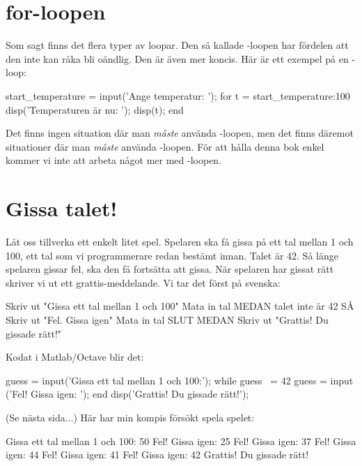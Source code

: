 \section{for-loopen}
Som sagt finns det flera typer av loopar. Den så kallade -loopen har fördelen att den inte kan råka bli oändlig. Den är även mer koncis. Här är ett exempel på en -loop:
\vspace{10pt}
\begin{matlab}
start_temperature = input('Ange temperatur: ');
for t = start_temperature:100
	disp('Temperaturen är nu: ');
	disp(t);
end
\end{matlab}

Det finns ingen situation där man \emph{måste} använda -loopen, men det finns däremot situationer där man \emph{måste} använda -loopen. För att hålla denna bok enkel kommer vi inte att arbeta något mer med -loopen.

\section{Gissa talet!}\label{subsec:gissa_talet1}
Låt oss tillverka ett enkelt litet spel. Spelaren ska få gissa på ett tal mellan 1 och 100, ett tal som vi programmerare redan bestämt innan. Talet är 42. Så länge spelaren gissar fel, ska den få fortsätta att gissa. När spelaren har gissat rätt skriver vi ut ett grattis-meddelande. Vi tar det först på svenska:

\begin{pseudo}
Skriv ut "Gissa ett tal mellan 1 och 100"
Mata in tal
MEDAN talet inte är 42 SÅ
   Skriv ut "Fel. Gissa igen"
   Mata in tal
SLUT MEDAN
Skriv ut "Grattis! Du gissade rätt!"
\end{pseudo}

Kodat i Matlab/Octave blir det:

\begin{matlab}[caption={Gissa talet},label={}]
guess = input('Gissa ett tal mellan 1 och 100:');
while guess ~= 42
    guess = input ('Fel! Gissa igen: ');
end
disp('Grattis! Du gissade rätt!');
\end{matlab}

(Se nästa sida...)
\newpage
Här har min kompis försökt spela spelet:

\vspace{10pt}
\begin{matlab}
Gissa ett tal mellan 1 och 100: 50
Fel! Gissa igen: 25
Fel! Gissa igen: 37
Fel! Gissa igen: 44
Fel! Gissa igen: 41
Fel! Gissa igen: 42
Grattis! Du gissade rätt!
\end{matlab}

